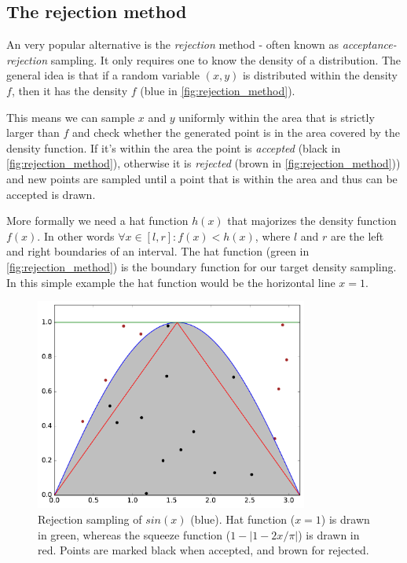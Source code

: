 \documentclass[]{article}
\begin{document}
\subsection{The rejection method}

An very popular alternative is the \textit{rejection} method - often known as \textit{acceptance-rejection} sampling. It only requires one to know the density of a distribution. The general idea is that if a random variable $(x, y)$ is distributed within the density $f$, then it has the density $f$ (blue in \autoref{fig:rejection_method}).

This means we can sample $x$ and $y$ uniformly within the area that is strictly larger than $f$ and check whether the generated point is in the area covered by the density function. If it's within the area the point is \textit{accepted} (black in \autoref{fig:rejection_method}), otherwise it is \textit{rejected} (brown in \autoref{fig:rejection_method})) and new points are sampled until a point that is within the area and thus can be accepted is drawn.

More formally we need a hat function $h(x)$ that majorizes the density function $f(x)$. In other words $ \forall x \in [l, r]: f(x) < h(x)$, where $l$ and $r$ are the left and right boundaries of an interval.
The hat function (green in \autoref{fig:rejection_method}) is the boundary function for our target density sampling. In this simple example the hat function would be the horizontal line $x = 1$.

\begin{figure}[h!]
\centering
\includegraphics[width=0.8\textwidth]{figs/rejection_sampling.pdf}
\caption{Rejection sampling of $sin(x)$ (blue). Hat function ($x = 1$) is drawn in green, whereas the squeeze function ($1 - |1 - 2x / \pi |$) is drawn in red. Points are marked black when accepted, and brown for rejected.}
\label{fig:rejection_method}
\end{figure}
\end{document}

